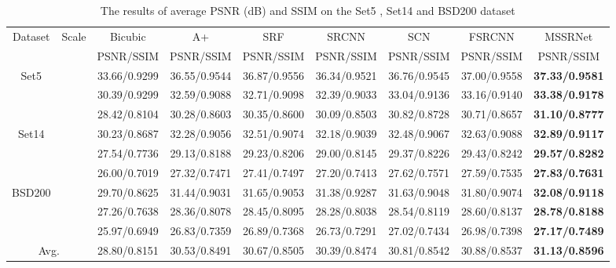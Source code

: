 \documentclass{article}
\begin{document}
\begin{table*}[]
\small
\centering
\caption{The results of average PSNR (dB) and SSIM on the Set5 \cite{ref18}, Set14 \cite{ref19} and BSD200 \cite{ref20} dataset}
\label{tab:quantitative}
\begin{tabular}{|c|c|c|c|c|c|c|c|c|}
\hline
\multirow{2}{*}{Dataset} & \multirow{2}{*}{Scale} & Bicubic      & A+           & SRF          & SRCNN        & SCN          & FSRCNN       & MSSRNet               \\ \cline{3-9} 
                         &                        & PSNR/SSIM    & PSNR/SSIM    & PSNR/SSIM    & PSNR/SSIM    & PSNR/SSIM    & PSNR/SSIM    & PSNR/SSIM             \\ \hline
\multirow{3}{*}{Set5}    &                       & 33.66/0.9299 & 36.55/0.9544 & 36.87/0.9556 & 36.34/0.9521 & 36.76/0.9545 & 37.00/0.9558 & \textbf{37.33/0.9581} \\ \cline{2-9} 
                         &                      & 30.39/0.9299 & 32.59/0.9088 & 32.71/0.9098 & 32.39/0.9033 & 33.04/0.9136 & 33.16/0.9140 & \textbf{33.38/0.9178} \\ \cline{2-9} 
                         &                       & 28.42/0.8104 & 30.28/0.8603 & 30.35/0.8600 & 30.09/0.8503 & 30.82/0.8728 & 30.71/0.8657 & \textbf{31.10/0.8777} \\ \hline
\multirow{3}{*}{Set14}   &                       & 30.23/0.8687 & 32.28/0.9056 & 32.51/0.9074 & 32.18/0.9039 & 32.48/0.9067 & 32.63/0.9088 & \textbf{32.89/0.9117} \\ \cline{2-9} 
                         &                       & 27.54/0.7736 & 29.13/0.8188 & 29.23/0.8206 & 29.00/0.8145 & 29.37/0.8226 & 29.43/0.8242 & \textbf{29.57/0.8282} \\ \cline{2-9} 
                         &                       & 26.00/0.7019 & 27.32/0.7471 & 27.41/0.7497 & 27.20/0.7413 & 27.62/0.7571 & 27.59/0.7535 & \textbf{27.83/0.7631} \\ \hline
\multirow{3}{*}{BSD200}  &                       & 29.70/0.8625 & 31.44/0.9031 & 31.65/0.9053 & 31.38/0.9287 & 31.63/0.9048 & 31.80/0.9074 & \textbf{32.08/0.9118} \\ \cline{2-9} 
                         &                       & 27.26/0.7638 & 28.36/0.8078 & 28.45/0.8095 & 28.28/0.8038 & 28.54/0.8119 & 28.60/0.8137 & \textbf{28.78/0.8188} \\ \cline{2-9} 
                         &                       & 25.97/0.6949 & 26.83/0.7359 & 26.89/0.7368 & 26.73/0.7291 & 27.02/0.7434 & 26.98/0.7398 & \textbf{27.17/0.7489} \\ \hline
\multicolumn{2}{|c|}{Avg.}                        & 28.80/0.8151 & 30.53/0.8491 & 30.67/0.8505 & 30.39/0.8474 & 30.81/0.8542 & 30.88/0.8537 & \textbf{31.13/0.8596} \\ \hline
\end{tabular}
\vspace{-0.5cm}
\end{table*}
\end{document}
